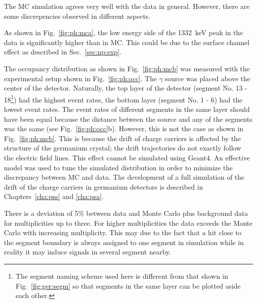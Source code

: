The MC simulation agrees very well with the data in general. However,
there are some discrepencies observed in different aspects.

As shown in Fig.~\ref{fig:ph:mca}, the low energy side of the 1332~keV
peak in the data is significantly higher than in MC. This could be due
to the surface channel effect as described in Sec.~\ref{sec:np:exp}.

The occupancy distribution as shown in Fig.~\ref{fig:ph:mcb} was
measured with the experimental setup shown in
Fig.~\ref{fig:ph:occ}. The $\gamma$ source was placed above the center
of the detector. Naturally, the top layer of the detector (segment
No. 13 - 18\footnote{The segment naming scheme used here is different
from that shown in Fig.~\ref{fig:ger:segm} so that segments in the
same layer can be plotted aside each other.}) had the highest event
rates, the bottom layer (segment No. 1 - 6) had the lowest event
rates. The event rates of different segments in the same layer should
have been equal because the distance between the source and any of the
segments was the same (see Fig.~\ref{fig:ph:occ}b). However, this is
not the case as shown in Fig.~\ref{fig:ph:mcb}. This is because the
drift of charge carriers is affected by the structure of the germanium
crystal; the drift trajectories do not exactly follow the electric
field lines. This effect cannot be simulated using Geant4. An
effective model was used to tune the simulated distribution in order
to minimize the discrepancy between MC and data. The development of a
full simulation of the drift of the charge carriers in germanium
detectors is described in Chapters~\ref{cha:pss} and \ref{cha:psa}.

There is a deviation of 5\% between data and Monte Carlo plus
background data for multiplicities up to three. For higher
multiplicities the data exceeds the Monte Carlo with increasing
multiplicity. This may due to the fact that a hit close to the segment
boundary is always assigned to one segment in simulation while in
reality it may induce signals in several segment nearby.

